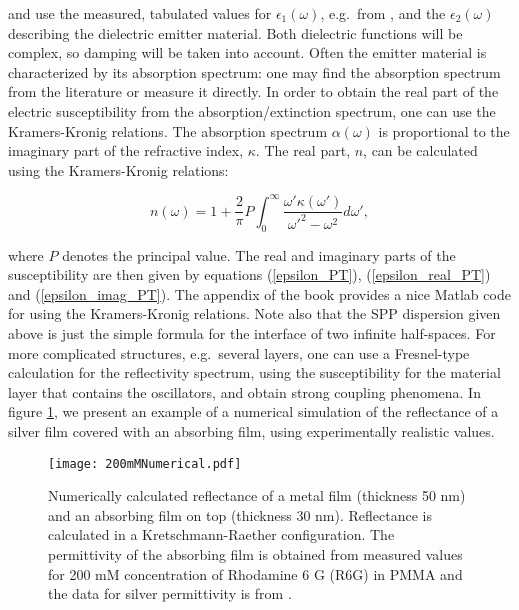 \documentclass[12pt]{iopart}
\begin{document}
\noindent and use the measured, tabulated values for $\epsilon_1(\omega)$, e.g.\ from \cite{Johnson1972,Palik1991,Li2013}, and the $\epsilon_2(\omega)$ describing the dielectric emitter material. Both dielectric functions will be complex, so damping will be taken into account. Often the emitter material is characterized by its absorption spectrum: one may find the absorption spectrum from the literature or measure it directly. In order to obtain the real part of the electric susceptibility from the absorption/extinction spectrum, one can use the Kramers-Kronig relations. The absorption spectrum $\alpha (\omega)$ is proportional to the imaginary part of the refractive index, $\kappa$. The real part, $n$, can be calculated using the Kramers-Kronig relations:

\begin{equation}
n(\omega) = 1 + \frac{2}{\pi} P \int_0^\infty \frac{\omega' \kappa(\omega')}{\omega'^2-\omega^2} d\omega' ,
\end{equation}

\noindent where $P$ denotes the principal value. The real and imaginary parts of the susceptibility are then given by equations (\ref{epsilon_PT}), (\ref{epsilon_real_PT}) and (\ref{epsilon_imag_PT}). The appendix of the book \cite{Lucarini2005} provides a nice Matlab code for using the Kramers-Kronig relations. Note also that the SPP dispersion given above is just the simple formula for the interface of two infinite half-spaces. For more complicated structures, e.g.\ several layers, one can use a Fresnel-type calculation for the reflectivity spectrum, using the susceptibility for the material layer that contains the oscillators, and obtain strong coupling phenomena. In figure \ref{numericalPlotPT}, we present an example of a numerical simulation of the reflectance of a silver film covered with an absorbing film, using experimentally realistic values. 

\begin{figure}
\texttt{[image: 200mMNumerical.pdf]}
\caption{Numerically calculated reflectance of a metal film (thickness 50 nm) and an absorbing film 
on top (thickness 30 nm). Reflectance is calculated in a Kretschmann-Raether configuration. The permittivity of the absorbing film is obtained from measured values for 200 mM concentration of Rhodamine 6 G (R6G) in PMMA and the data for silver permittivity is from \cite{Johnson1972}.} 
\label{numericalPlotPT}
\end{figure}
\end{document}
